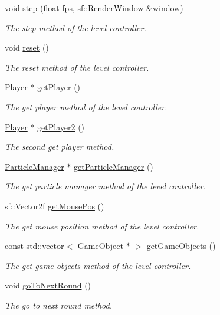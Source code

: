\begin{DoxyCompactItemize}
void \hyperlink{class_level_controller_acc3a82f2de457b3cb3863c5bb49a909c}{step} (float fps, sf\+::\+Render\+Window \&window)
\begin{DoxyCompactList}\small\item\em The step method of the level controller. \end{DoxyCompactList}\item 
void \hyperlink{class_level_controller_a5d7b9ef50353a7d1e357632180ce75e5}{reset} ()
\begin{DoxyCompactList}\small\item\em The reset method of the level controller. \end{DoxyCompactList}\item 
\hyperlink{class_player}{Player} $\ast$ \hyperlink{class_level_controller_a203ded80ef03720a9e9069d54e500689}{get\+Player} ()
\begin{DoxyCompactList}\small\item\em The get player method of the level controller. \end{DoxyCompactList}\item 
\hyperlink{class_player}{Player} $\ast$ \hyperlink{class_level_controller_a327a14ec720c334f0f6c92ae3ad33924}{get\+Player2} ()
\begin{DoxyCompactList}\small\item\em The second get player method. \end{DoxyCompactList}\item 
\hyperlink{class_particle_manager}{Particle\+Manager} $\ast$ \hyperlink{class_level_controller_a8e3f9f2081f00f3e1ade44eb7e8c24ad}{get\+Particle\+Manager} ()
\begin{DoxyCompactList}\small\item\em The get particle manager method of the level controller. \end{DoxyCompactList}\item 
sf\+::\+Vector2f \hyperlink{class_level_controller_ac08e5cb1592d8e7378253732e9989801}{get\+Mouse\+Pos} ()
\begin{DoxyCompactList}\small\item\em The get mouse position method of the level controller. \end{DoxyCompactList}\item 
const std\+::vector$<$ \hyperlink{class_game_object}{Game\+Object} $\ast$ $>$ \hyperlink{class_level_controller_a331dc36b48234e99d07a6db68e700297}{get\+Game\+Objects} ()
\begin{DoxyCompactList}\small\item\em The get game objects method of the level controller. \end{DoxyCompactList}\item 
void \hyperlink{class_level_controller_a77c7be37cbb30dc3ff6574c053562260}{go\+To\+Next\+Round} ()
\begin{DoxyCompactList}\small\item\em The go to next round method. \end{DoxyCompactList}\end{DoxyCompactItemize}
